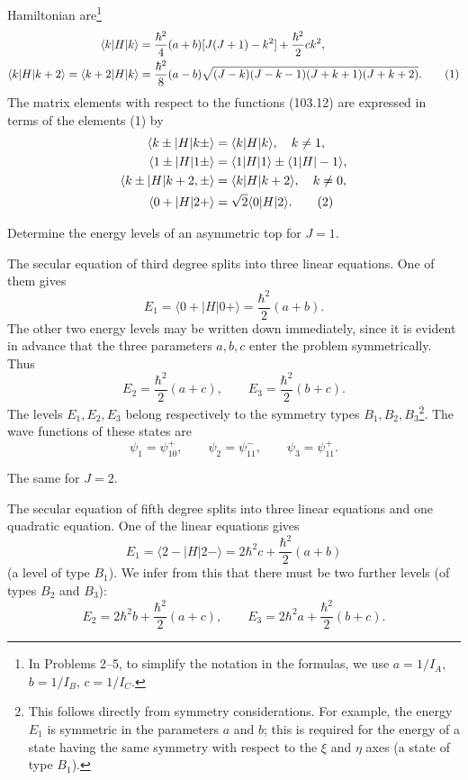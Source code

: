 Hamiltonian are\footnote{In Problems 2--5, to simplify the notation in the formulas, we use $a=1/I_A$, $b=1/I_B$, $c=1/I_C$.}
\begin{align}
 \langle k|H|k\rangle&=\frac{\hbar^2}{4}(a+b)[J(J+1)-k^2]+\frac{\hbar^2}{2}ck^2,\notag\\
 \langle k|H|k+2\rangle=\langle k+2|H|k\rangle&=\frac{\hbar^2}{8}(a-b)\sqrt{(J-k)(J-k-1)(J+k+1)(J+k+2)}. \tag{1}
\end{align}
The matrix elements with respect to the functions (103.12) are expressed in terms of the elements (1) by
\begin{align}
 \langle k\pm|H|k\pm\rangle&=\langle k|H|k\rangle,\quad k\ne1,\notag\\
 \langle1\pm|H|1\pm\rangle&=\langle1|H|1\rangle\pm\langle1|H|-1\rangle,\notag\\
 \langle k\pm|H|k+2,\pm\rangle&=\langle k|H|k+2\rangle,\quad k\ne0,\notag\\
 \langle0+|H|2+\rangle&=\sqrt2\langle0|H|2\rangle. \tag{2}
\end{align}

 Determine the energy levels of an asymmetric top for $J=1$.

\SolutionHeading The secular equation of third degree splits into three linear equations. One of them gives
\begin{equation}
 E_1=\langle0+|H|0+\rangle=\frac{\hbar^2}{2}(a+b). \tag{3}
\end{equation}
The other two energy levels may be written down immediately, since it is evident in advance that the three parameters $a,b,c$ enter the problem symmetrically. Thus
\begin{equation}
 E_2=\frac{\hbar^2}{2}(a+c),\qquad E_3=\frac{\hbar^2}{2}(b+c). \tag{4}
\end{equation}
The levels $E_1,E_2,E_3$ belong respectively to the symmetry types $B_1,B_2,B_3$\footnote{This follows directly from symmetry considerations. For example, the energy $E_1$ is symmetric in the parameters $a$ and $b$; this is required for the energy of a state having the same symmetry with respect to the $\xi$ and $\eta$ axes (a state of type $B_1$).}. The wave functions of these states are
\[
 \psi_1=\psi_{10}^+,\qquad \psi_2=\psi_{11}^-,\qquad \psi_3=\psi_{11}^+.
\]

 The same for $J=2$.

\SolutionHeading The secular equation of fifth degree splits into three linear equations and one quadratic equation. One of the linear equations gives
\begin{equation}
 E_1=\langle2-|H|2-\rangle=2\hbar^2c+\frac{\hbar^2}{2}(a+b) \tag{5}
\end{equation}
(a level of type $B_1$). We infer from this that there must be two further levels (of types $B_2$ and $B_3$):
\[
 E_2=2\hbar^2b+\frac{\hbar^2}{2}(a+c),\qquad E_3=2\hbar^2a+\frac{\hbar^2}{2}(b+c).
\]

